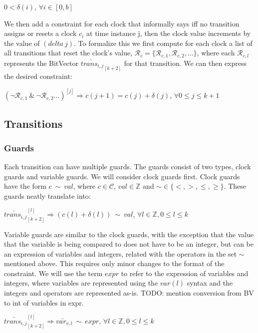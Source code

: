 \documentclass[a4paper,11pt]{article}
\begin{document}
\(0 < \delta(i)\), \(\forall i \in [0,b]\)

We then add a constraint for each clock that informally says iff no transition
assigns or resets a clock \(c_i\) at time instance j, then the clock value
increments by the value of \((delta\ j)\). To formalize this we first compute
for each clock a list of all transitions that reset the clock's value,
\(\mathcal{R}_c = \{\mathcal{R}_{c,1}, \mathcal{R}_{c,2}, \ldots\}\), where each
\(\mathcal{R}_{c,l}\) represents the BitVector
\(\overleftarrow{trans_{i,j}}_{[k+2]}\) for that transition. We can then express
the desired constraint:

\((\neg \mathcal{R}_{c,1}\ \&\ \neg \mathcal{R}_{c,2} \ldots )^{[j]}
\Rightarrow c(j+1) = c(j) + \delta(j)\), \(\forall 0 \leq j \leq k+1\)


\subsection{Transitions}
\label{sec:orgdac5489}
\subsubsection{Guards}
\label{sec:org4e8185c}

Each transition can have multiple guards. The guards consist of two types, clock
guards and variable guards. We will consider clock guards first. Clock guards
have the form \(c\ \sim\ val\), where \(c \in \mathcal{C}\), \(val \in
\mathbb{Z}\) and \(\sim \in \{<,>,\leq,\geq\}\). These guards neatly translate
into:

\(\overleftarrow{trans_{i,j}}_{[k+2]}^{[l]} \Rightarrow  (c(l) + \delta(l))\ \sim\
val\), \(\forall l \in \mathbb{Z}, 0 \leq l \leq k\)

Variable guards are similar to the clock guards, with the exception that the
value that the variable is being compared to does not have to be an integer, but
can be an expression of variables and integers, related with the operators in
the set \(\sim\) mentioned above. This requires only minor changes to the format
of the constraint. We will use the term \(expr\) to refer to the expression of
variables and integers, where variables are represented using the \(var(l)\)
syntax and the integers and operators are represented as-is. TODO: mention
conversion from BV to int of variables in expr.

\(\overleftarrow{trans_{i,j}}_{[k+2]}^{[l]} \Rightarrow  \overleftarrow{var_{v,l}}\ \sim\
expr\), \(\forall l \in \mathbb{Z}, 0 \leq l \leq k\)
\end{document}
